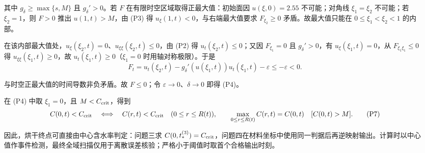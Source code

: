 \indent 其中 $g_\delta\ge\max\{s,M\}$ 且 $g_\delta'>0$。若 $F$ 在有限时空区域取得正最大值：初始面因 $u(\xi,0)=2.55$ 不可能；对角线 $\xi_1=\xi_2$ 不可能；若 $\xi_2=1$，则 $F>0$ 推出 $u(1,t)>M$，由 (P3) 得 $u_\xi(1,t)<0$，与右端最大值要求 $F_{\xi_2}\ge0$ 矛盾。故最大值只能在 $0\le\xi_1<\xi_2<1$ 的内部。

\indent 在该内部最大值处，$u_\xi(\xi_2,t)=0$、$u_{\xi\xi}(\xi_2,t)\le0$，由 (P2) 得 $u_t(\xi_2,t)\le0$；又因 $F_{\xi_1}=0$ 且 $g_\delta'>0$，有 $u_\xi(\xi_1,t)=0$，从 $F_{\xi_1\xi_1}\le0$ 得 $u_{\xi\xi}(\xi_1,t)\ge0$，故 $u_t(\xi_1,t)\ge0$（$\xi_1=0$ 时用轴对称极限）。于是
\begin{equation*}
 F_t=u_t(\xi_2,t)-g_\delta'(u(\xi_1,t))u_t(\xi_1,t)-\varepsilon\le-\varepsilon<0.
 \tag{P6}
\end{equation*}

\indent 与时空正最大值的时间导数非负矛盾。故 $F\le0$；令 $\varepsilon\to0$、$\delta\to0$ 即得 (P4)。

\indent 在 (P4) 中取 $\xi_1=0$，且 $M<C_{\rm crit}$，得到
\begin{equation*}
 C(0,t)<C_{\rm crit}\quad\Longleftrightarrow\quad
 C(r,t)<C_{\rm crit}\quad(0\le r\le R(t)),
 \qquad \max_{0\le r\le R(t)}C(r,t)=C(0,t)\quad[C(0,t)>M].
 \tag{P7}
\end{equation*}

\indent 因此，烘干终点可直接由中心含水率判定：问题三求 $C(0,t_*^{(3)})=C_{\rm crit}$，问题四在材料坐标中使用同一判据后再逆映射输出。计算时以中心值作事件检测，最终全域扫描仅用于离散误差核验；严格小于阈值时取首个合格输出时刻。

\endgroup
